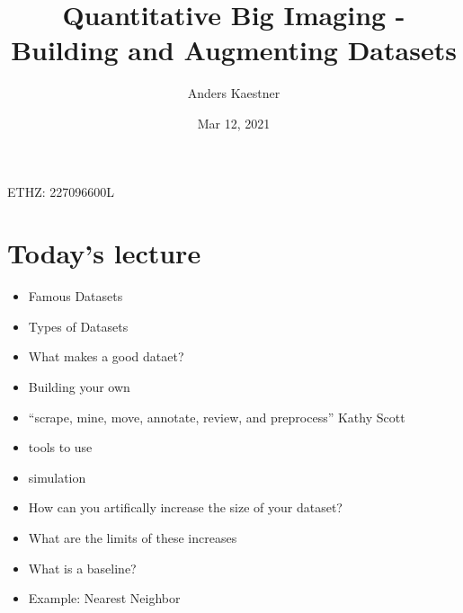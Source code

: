 \documentclass[letterpaper,10pt,english]{sphinxmanual}
\title{Quantitative Big Imaging - Building and Augmenting Datasets}
\date{Mar 12, 2021}
\author{Anders Kaestner}
\begin{document}
\pagestyle{empty}
\sphinxmaketitle
\pagestyle{plain}
\sphinxtableofcontents
\pagestyle{normal}
\label{\detokenize{03-Datasets::doc}}


\sphinxAtStartPar
{} ETHZ: 227\sphinxhyphen{}0966\sphinxhyphen{}00L




\chapter{Today’s lecture}
\label{\detokenize{03-Datasets:today-s-lecture}}
\sphinxAtStartPar
{}
\begin{itemize}
\item {} 
\sphinxAtStartPar
Famous Datasets

\item {} 
\sphinxAtStartPar
Types of Datasets

\item {} 
\sphinxAtStartPar
What makes a good dataet?

\item {} 
\sphinxAtStartPar
Building your own

\item {} 
\sphinxAtStartPar
“scrape, mine, move, annotate, review, and preprocess” \sphinxhyphen{} Kathy Scott

\item {} 
\sphinxAtStartPar
tools to use

\item {} 
\sphinxAtStartPar
simulation

\end{itemize}

\sphinxAtStartPar
{}
\begin{itemize}
\item {} 
\sphinxAtStartPar
How can you artifically increase the size of your dataset?

\item {} 
\sphinxAtStartPar
What are the limits of these increases

\end{itemize}

\sphinxAtStartPar
{}
\begin{itemize}
\item {} 
\sphinxAtStartPar
What is a baseline?

\item {} 
\sphinxAtStartPar
Example: Nearest Neighbor

\end{itemize}
\end{document}
